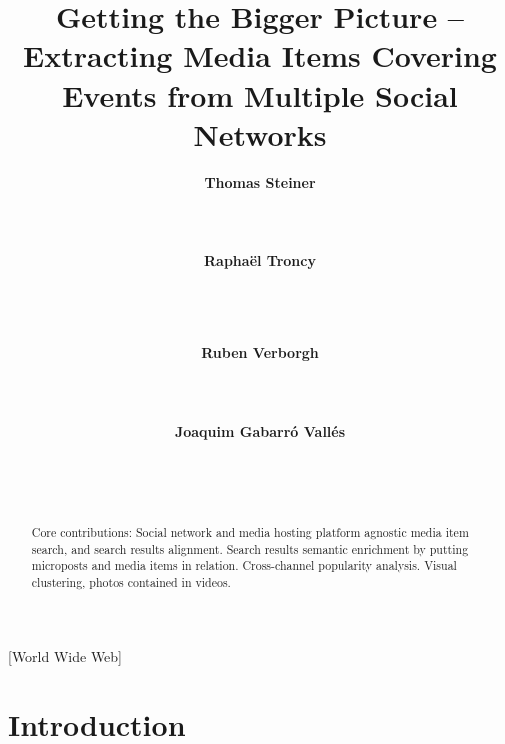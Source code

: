 \documentclass{acm_proc_article-sp}
\newcommand{\todo}[1]{\noindent\textcolor{red}{{\bf \{TODO}: #1{\bf \}}}}
\begin{document}
\title{Getting the Bigger Picture -- Extracting Media Items Covering Events from Multiple Social Networks}

\author{
\alignauthor
\textbf{Thomas Steiner}\\
	\\
	\\
	\\
\alignauthor
\textbf{Raphaël Troncy}\\
	\\
	\\
	\\
\and
\alignauthor
\textbf{Ruben Verborgh}\\ 	
	\\
	\\
	\\
\alignauthor
\textbf{Joaquim Gabarró Vallés}\\
	\\
	\\
	\\
}

\maketitle

\begin{abstract}
Core contributions:
Social network and media hosting platform agnostic media item search, and search results alignment.
Search results semantic enrichment by putting microposts and media items in relation.
Cross-channel popularity analysis.
Visual clustering, photos contained in videos.
\end{abstract}

[World Wide Web]

\keywords{\todo{Keywords}}

\section{Introduction} \label{sec:introduction}
\end{document}
